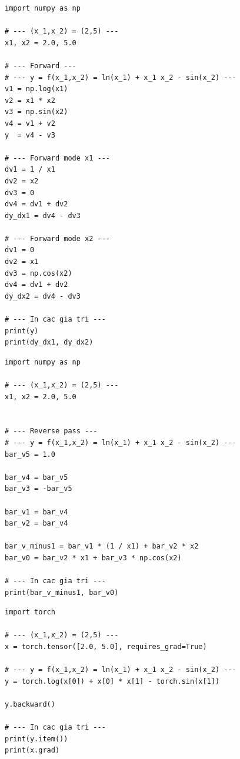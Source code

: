 \begin{lstlisting}[caption=Cài đặt chế độ thuận bằng thư viện NumPy]
import numpy as np

# --- (x_1,x_2) = (2,5) ---
x1, x2 = 2.0, 5.0

# --- Forward ---
# --- y = f(x_1,x_2) = ln(x_1) + x_1 x_2 - sin(x_2) ---
v1 = np.log(x1)
v2 = x1 * x2
v3 = np.sin(x2)
v4 = v1 + v2
y  = v4 - v3

# --- Forward mode x1 ---
dv1 = 1 / x1
dv2 = x2
dv3 = 0
dv4 = dv1 + dv2
dy_dx1 = dv4 - dv3

# --- Forward mode x2 ---
dv1 = 0
dv2 = x1
dv3 = np.cos(x2)
dv4 = dv1 + dv2
dy_dx2 = dv4 - dv3

# --- In cac gia tri ---
print(y)
print(dy_dx1, dy_dx2)
\end{lstlisting}

\begin{lstlisting}[caption=Cài đặt chế độ đảo bằng thư viện NumPy]
import numpy as np

# --- (x_1,x_2) = (2,5) ---
x1, x2 = 2.0, 5.0


# --- Reverse pass ---
# --- y = f(x_1,x_2) = ln(x_1) + x_1 x_2 - sin(x_2) ---
bar_v5 = 1.0

bar_v4 = bar_v5
bar_v3 = -bar_v5

bar_v1 = bar_v4
bar_v2 = bar_v4

bar_v_minus1 = bar_v1 * (1 / x1) + bar_v2 * x2
bar_v0 = bar_v2 * x1 + bar_v3 * np.cos(x2)

# --- In cac gia tri ---
print(bar_v_minus1, bar_v0)
\end{lstlisting}

\begin{lstlisting}[caption= Cơ chế vi phân tự động bằng PyTorch]
import torch

# --- (x_1,x_2) = (2,5) ---
x = torch.tensor([2.0, 5.0], requires_grad=True)

# --- y = f(x_1,x_2) = ln(x_1) + x_1 x_2 - sin(x_2) ---
y = torch.log(x[0]) + x[0] * x[1] - torch.sin(x[1])

y.backward()

# --- In cac gia tri ---
print(y.item())
print(x.grad)
\end{lstlisting}